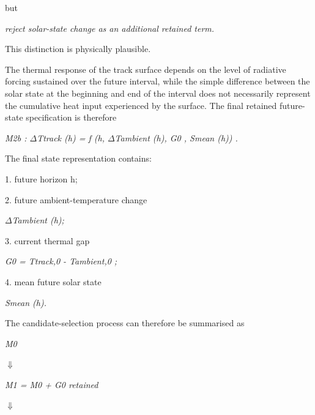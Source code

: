 but

\begin{center}\textit{reject solar-state change as an additional retained term.}\end{center}

This distinction is physically plausible.

The thermal response of the track surface depends on the level of radiative forcing sustained over the future interval, while the simple difference between the solar state at the beginning and end of the interval does not necessarily represent the cumulative heat input experienced by the surface. The final retained future-state specification is therefore

\begin{center}\textit{M2b : \ensuremath{\Delta}Ttrack (h) = f (h, \ensuremath{\Delta}Tambient (h), G0 , Smean (h)) .}\end{center}

The final state representation contains:

1. future horizon h;

2. future ambient-temperature change

\begin{center}\textit{\ensuremath{\Delta}Tambient (h);}\end{center}

3. current thermal gap

\begin{center}\textit{G0 = Ttrack,0 - Tambient,0 ;}\end{center}

4. mean future solar state

\begin{center}\textit{Smean (h).}\end{center}

The candidate-selection process can therefore be summarised as

\begin{center}\textit{M0}\end{center}

\begin{center}\textit{\ensuremath{\Downarrow}}\end{center}

\begin{center}\textit{M1 = M0 + G0        retained}\end{center}

\begin{center}\textit{\ensuremath{\Downarrow}}\end{center}

